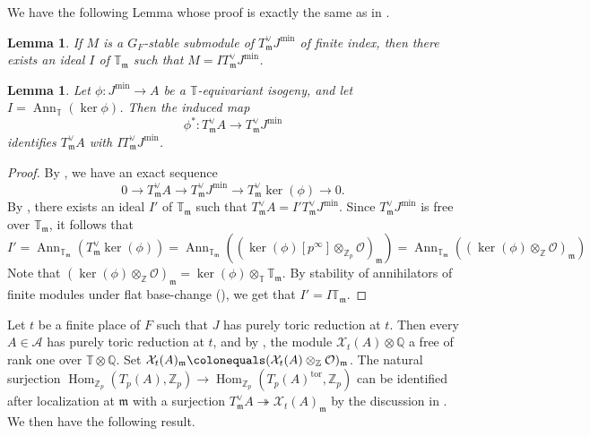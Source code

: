\documentclass[a4paper, notitlepage, 10pt]{amsart}
\newcommand{\stackcite}[1]{\cite[\href{https://stacks.math.columbia.edu/tag/#1}{#1}]{stk}}
\theoremstyle{plain} %
\newtheorem{lemma}[theorem]{Lemma}
\theoremstyle{definition} %
\theoremstyle{remark} %
\numberwithin{equation}{section}
\newcommand{\bbQ}{\mathbb Q}
\newcommand{\bbT}{\mathbb T}
\newcommand{\bbZ}{\mathbb Z}
\newcommand{\Ann}{\operatorname{Ann}} %
\newcommand{\Hom}{\operatorname{Hom}} %
\begin{document}
We have the following Lemma whose proof is exactly the same as in \cite[Lemma 4.6]{Helm}.

\begin{lemma}\label{existsideal}
    If $M$ is a $G_{F}$-stable submodule of $T^\vee_{\mathfrak{m}}J^{\min}$ of finite index, then there exists an ideal $I$ of $\bbT_{\mathfrak{m}}$ such that $M=I T^\vee_{\mathfrak{m}}J^{\min}$.
\end{lemma}
\begin{lemma}\label{annihilatorisogeny}
Let $\phi\colon J^{\min}\to A$ be a $\bbT$-equivariant isogeny, and let $I=\Ann_{\bbT}(\ker\phi)$. Then the induced map
$$ \phi^* \colon T_{\mathfrak{m}}^\vee A\longrightarrow T_{\mathfrak{m}}^\vee J^{\min} $$
identifies $T_{\mathfrak{m}}^\vee A$ with $IT_{\mathfrak{m}}^\vee J^{\min}$.
\end{lemma}
\begin{proof}
    By \cite[Lemma 2.1]{Em03}, we have an exact sequence 
    \begin{equation*}
        0 \to T_{\mathfrak{m}}^\vee A \to T_{\mathfrak{m}}^\vee J^{\min} \to T_{\mathfrak{m}}^\vee \ker(\phi) \to 0.
    \end{equation*}
    By , there exists an ideal $I'$ of $\bbT_{\mathfrak{m}}$ such that $T_{\mathfrak{m}}^\vee A = I'T_{\mathfrak{m}}^\vee J^{\min}$. Since $T^\vee_{\mathfrak{m}}J^{\min}$ is free over $\bbT_{\mathfrak{m}}$, it follows that $$I'=\Ann_{\bbT_{\mathfrak{m}}}(T_{\mathfrak{m}}^\vee \ker(\phi))=\Ann_{\bbT_{\mathfrak{m}}}((\ker(\phi)[p^\infty]\otimes_{\bbZ_p}\mathcal{O})_{\mathfrak{m}})=\Ann_{\bbT_{\mathfrak{m}}}((\ker(\phi)\otimes_{\bbZ}\mathcal{O})_{\mathfrak{m}})$$ 
    Note that $(\ker(\phi)\otimes_{\bbZ}\mathcal{O})_{\mathfrak{m}}=\ker(\phi)\otimes_{\bbT}\bbT_{\mathfrak{m}}$. By stability of annihilators of finite modules under flat base-change (\stackcite{07T8}), we get that $I'=I\bbT_{\mathfrak{m}}$.
\end{proof}
Let $t$ be a finite place of $F$ such that $J$ has purely toric reduction at $t$. Then every $A\in \mathcal{A}$ has purely toric reduction at $t$, and by \cite[Lemma 4.13]{Helm}, the module $\mathcal{X}_t(A)\otimes \bbQ$ a free of rank one over $\bbT\otimes \bbQ$. Set $\mathcal{X}_t(A)_{\mathfrak{m}}\colonequals (\mathcal{X}_t(A)\otimes_{\bbZ}\mathcal{O})_{\mathfrak{m}}$. The natural surjection $\Hom_{\mathbb{Z}_p}(T_p(A),\mathbb{Z}_p)\to \Hom_{\mathbb{Z}_p}(T_p(A)^{\mathrm{tor}},\mathbb{Z}_p) $ can be identified after localization at $\mathfrak{m}$ with a surjection $T^\vee_{\mathfrak{m}}A\twoheadrightarrow \mathcal{X}_t(A)_{\mathfrak{m}}$ by the discussion in .  We then have the following result.
\end{document}
